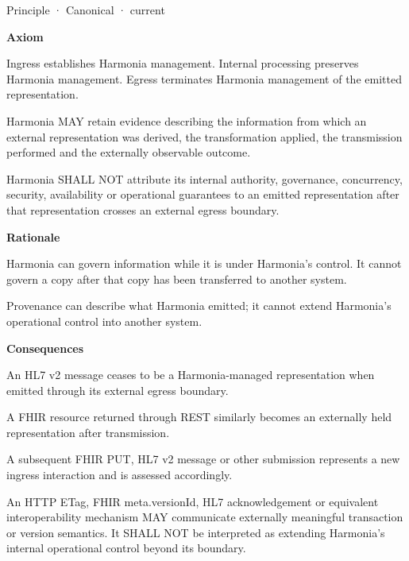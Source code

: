 \label{element:b6a55decfeec4f1bb3d7f18534a2ffea}
{\small Principle · Canonical · current}\par

\par\medskip\textbf{Axiom}\par


Ingress establishes Harmonia management. Internal processing preserves
Harmonia management. Egress terminates Harmonia management of the
emitted representation.



Harmonia MAY retain evidence describing the information from which an
external representation was derived, the transformation applied, the
transmission performed and the externally observable outcome.



Harmonia SHALL NOT attribute its internal authority, governance,
concurrency, security, availability or operational guarantees to an
emitted representation after that representation crosses an external
egress boundary.



\par\medskip\textbf{Rationale}\par


Harmonia can govern information while it is under Harmonia's control. It
cannot govern a copy after that copy has been transferred to another
system.



Provenance can describe what Harmonia emitted; it cannot extend
Harmonia's operational control into another system.



\par\medskip\textbf{Consequences}\par


An HL7 v2 message ceases to be a Harmonia-managed representation when
emitted through its external egress boundary.



A FHIR resource returned through REST similarly becomes an externally
held representation after transmission.



A subsequent FHIR PUT, HL7 v2 message or other submission represents a
new ingress interaction and is assessed accordingly.



An HTTP ETag, FHIR meta.versionId, HL7 acknowledgement or equivalent
interoperability mechanism MAY communicate externally meaningful
transaction or version semantics. It SHALL NOT be interpreted as
extending Harmonia's internal operational control beyond its boundary.



